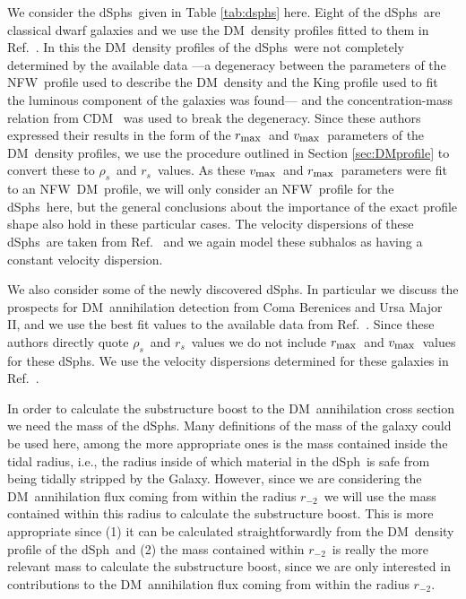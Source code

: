 \documentclass[aps,prd,twocolumn,amsmath,amssymb,floatfix,nofootinbib,10pt]{revtex4}
\newcommand{\ie}{i.e.}
\newcommand{\CDM}{CDM}
\newcommand{\NFW}{NFW}
\newcommand{\DM}{DM}
\newcommand{\rhos}{\ensuremath{\rho_s}}
\newcommand{\rs}{\ensuremath{r_s}}
\newcommand{\rminustwo}{\ensuremath{r_{-2}}}
\newcommand{\vmax}{\ensuremath{v_{\mbox{{\footnotesize max}}}}}
\newcommand{\rmax}{\ensuremath{r_{\mbox{{\footnotesize max}}}}}
\newcommand{\dSph}{dSph}
\newcommand{\dSphs}{dSphs}
\begin{document}
We consider the \dSphs\ given in Table \ref{tab:dsphs} here. Eight of
the \dSphs\ are classical dwarf galaxies and we use the \DM\ density
profiles fitted to them in Ref.~\cite{2008ApJ...672..904P}. In this
the \DM\ density profiles of the \dSphs\ were not completely
determined by the available data ---a degeneracy between the
parameters of the \NFW\ profile used to describe the \DM\ density and
the King profile used to fit the luminous component of the galaxies
was found--- and the concentration-mass relation from \CDM\
\cite{2001MNRAS.321..559B,2001ApJ...554..114E} was used to break the
degeneracy. Since these authors expressed their results in the form of
the \rmax\ and \vmax\ parameters of the \DM\ density profiles, we use
the procedure outlined in Section \ref{sec:DMprofile} to convert these
to \rhos\ and \rs\ values. As these \vmax\ and \rmax\ parameters were
fit to an \NFW\ \DM\ profile, we will only consider an \NFW\ profile
for the \dSphs\ here, but the general conclusions about the importance
of the exact profile shape also hold in these particular cases. The
velocity dispersions of these \dSphs\ are taken from
Ref.~\cite{1998ARA&A..36..435M} and we again model these subhalos as
having a constant velocity dispersion.

We also consider some of the newly discovered \dSphs. In particular we
discuss the prospects for \DM\ annihilation detection from Coma
Berenices and Ursa Major II, and we use the best fit values to the
available data from Ref.~\cite{2008ApJ...678..614S}. Since these
authors directly quote \rhos\ and \rs\ values we do not include \rmax\
and \vmax\ values for these \dSphs. We use the velocity dispersions
determined for these galaxies in Ref.~\cite{2007ApJ...670..313S}.

In order to calculate the substructure boost to the \DM\ annihilation
cross section we need the mass of the \dSphs. Many definitions of the
mass of the galaxy could be used here, among the more appropriate ones
is the mass contained inside the tidal radius, \ie, the radius inside
of which material in the \dSph\ is safe from being tidally stripped by
the Galaxy. However, since we are considering the \DM\ annihilation
flux coming from within the radius \rminustwo\ we will use the mass
contained within this radius to calculate the substructure boost. This
is more appropriate since (1) it can be calculated straightforwardly
from the \DM\ density profile of the \dSph\ and (2) the mass contained
within \rminustwo\ is really the more relevant mass to calculate the
substructure boost, since we are only interested in contributions to
the \DM\ annihilation flux coming from within the radius \rminustwo.
\end{document}
